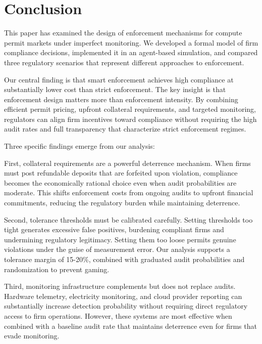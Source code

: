 
\section{Conclusion}

This paper has examined the design of enforcement mechanisms for compute permit markets under imperfect monitoring. We developed a formal model of firm compliance decisions, implemented it in an agent-based simulation, and compared three regulatory scenarios that represent different approaches to enforcement.

Our central finding is that smart enforcement achieves high compliance at substantially lower cost than strict enforcement. The key insight is that enforcement design matters more than enforcement intensity. By combining efficient permit pricing, upfront collateral requirements, and targeted monitoring, regulators can align firm incentives toward compliance without requiring the high audit rates and full transparency that characterize strict enforcement regimes.

Three specific findings emerge from our analysis:

First, collateral requirements are a powerful deterrence mechanism. When firms must post refundable deposits that are forfeited upon violation, compliance becomes the economically rational choice even when audit probabilities are moderate. This shifts enforcement costs from ongoing audits to upfront financial commitments, reducing the regulatory burden while maintaining deterrence.

Second, tolerance thresholds must be calibrated carefully. Setting thresholds too tight generates excessive false positives, burdening compliant firms and undermining regulatory legitimacy. Setting them too loose permits genuine violations under the guise of measurement error. Our analysis supports a tolerance margin of 15-20\%, combined with graduated audit probabilities and randomization to prevent gaming.

Third, monitoring infrastructure complements but does not replace audits. Hardware telemetry, electricity monitoring, and cloud provider reporting can substantially increase detection probability without requiring direct regulatory access to firm operations. However, these systems are most effective when combined with a baseline audit rate that maintains deterrence even for firms that evade monitoring.

